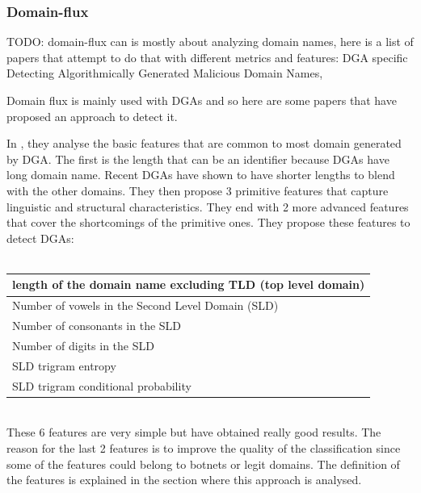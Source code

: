 \subsubsection{Domain-flux}
TODO: domain-flux can is mostly about analyzing domain names, here is a list of papers that attempt to do that with different metrics and features:  
DGA specific\\
Detecting Algorithmically Generated Malicious Domain Names, %

Domain flux is mainly used with DGAs and so here are some papers that have proposed an approach to detect it.

In \cite{dga}, they analyse the basic features that are common to most domain generated by DGA. The first is the length that can be an identifier because DGAs have long domain name. Recent DGAs have shown to have shorter lengths to blend with the other domains. They then propose 3 primitive features that capture linguistic and structural characteristics. They end with 2 more advanced features that cover the shortcomings of the primitive ones. They propose these features to detect DGAs:\\\\
\begin{tabular}{|l|}
\hline
length of the domain name excluding TLD (top level domain)\\
\hline
Number of vowels in the Second Level Domain (SLD)\\
\hline
Number of consonants in the SLD\\
\hline
Number of digits in the SLD\\
\hline
SLD trigram entropy\\
\hline
SLD trigram conditional probability\\
\hline
\end{tabular}
\\

These 6 features are very simple but have obtained really good results. The reason for the last 2 features is to improve the quality of the classification since some of the features could belong to botnets or legit domains. The definition of the features is explained in the section where this approach is analysed.

